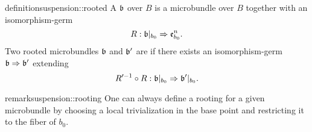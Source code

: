 \begin{mystatement}{definition}{suspension::rooted}
    A  $\bb$ over $B$ is a microbundle
    over $B$ together with an isomorphism-germ
    \[ \germdef{R}{\bbb}{\be{b_0}}. \]
    Two rooted microbundles $\bb$ and $\bb'$ are 
    if there exists an isomorphism-germ $\germ{\bb}{\bb'}$ extending
    \[ \germdef{\inv{R'} \circ R}{\bbb}{\bb'\restr{b_0}}. \]
\end{mystatement}

\begin{mystatement}{remark}{suspension::rooting}
    One can always define a rooting for a given microbundle 
    by choosing a local trivialization in the base point and restricting
    it to the fiber of $b_0$.
\end{mystatement}
